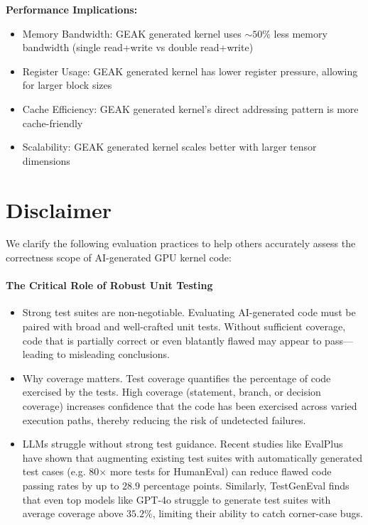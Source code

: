 \documentclass{article}
\begin{document}
\textbf{Performance Implications:}
\begin{itemize}
    \item Memory Bandwidth: GEAK generated kernel uses $\sim 50$\% less memory bandwidth (single read+write vs double read+write)
    \item Register Usage: GEAK generated kernel has lower register pressure, allowing for larger block sizes
    \item Cache Efficiency: GEAK generated kernel's direct addressing pattern is more cache-friendly
    \item Scalability: GEAK generated kernel scales better with larger tensor dimensions
\end{itemize}

\section{Disclaimer}


We clarify the following evaluation practices to help others accurately assess the correctness scope of AI-generated GPU kernel code:

\paragraph{The Critical Role of Robust Unit Testing}
\begin{itemize}
\item Strong test suites are non-negotiable.
   Evaluating AI-generated code must be paired with broad and well-crafted unit tests. Without sufficient coverage, code that is partially correct or even blatantly flawed may appear to pass—leading to misleading conclusions.

\item Why coverage matters.
   Test coverage quantifies the percentage of code exercised by the tests. High coverage (statement, branch, or decision coverage) increases confidence that the code has been exercised across varied execution paths, thereby reducing the risk of undetected failures.

\item LLMs struggle without strong test guidance.
   Recent studies like EvalPlus have shown that augmenting existing test suites with automatically generated test cases (e.g. $80$× more tests for HumanEval) can reduce flawed code passing rates by up to $28.9$ percentage points. Similarly, TestGenEval finds that even top models like GPT‑4o struggle to generate test suites with average coverage above $35.2$\%, limiting their ability to catch corner-case bugs.
\end{itemize}
\end{document}

